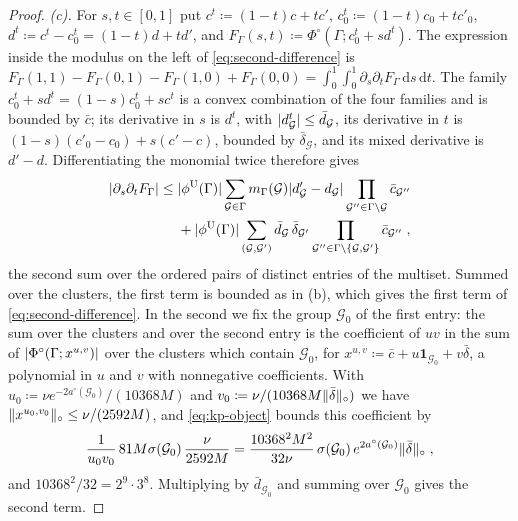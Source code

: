 \documentclass[11pt]{preprint}
\newcommand{\dd}{\mathrm{d}}
\DeclarePairedDelimiter{\abs}{\lvert}{\rvert}
\DeclarePairedDelimiter{\norm}{\lVert}{\rVert}
\numberwithin{equation}{section}
\theoremstyle{definition}
\theoremstyle{remark}
\theoremstyle{plain}
\begin{document}
\begin{proof}
\emph{(c).} For $s, t \in [0, 1]$ put $c^t \coloneqq (1 - t)c + tc'$, $c^t_0 \coloneqq (1 - t)c_0 + tc'_0$, $d^t \coloneqq c^t - c^t_0 = (1 - t)d + td'$, and $F_\Gamma(s, t) \coloneqq \Phi^\circ(\Gamma; c^t_0 + sd^t)$. The expression inside the modulus on the left of \eqref{eq:second-difference} is $F_\Gamma(1, 1) - F_\Gamma(0, 1) - F_\Gamma(1, 0) + F_\Gamma(0, 0) = \int_0^1\int_0^1\partial_s\partial_tF_\Gamma\,\dd s\,\dd t$. The family $c^t_0 + sd^t = (1 - s)c^t_0 + sc^t$ is a convex combination of the four families and is bounded by $\bar c$; its derivative in $s$ is $d^t$, with $\abs{d^t_{\mathcal G}} \leq \bar d_{\mathcal G}$, its derivative in $t$ is $(1 - s)(c'_0 - c_0) + s(c' - c)$, bounded by $\bar\delta_{\mathcal G}$, and its mixed derivative is $d' - d$. Differentiating the monomial twice therefore gives
\begin{align*}
    \abs{\partial_s\partial_tF_\Gamma} \leq{}& \abs{\phi^{\mathrm U}(\Gamma)}\sum_{\mathcal G \in \Gamma}m_\Gamma(\mathcal G)\abs{d'_{\mathcal G} - d_{\mathcal G}}\prod_{\mathcal G'' \in \Gamma \setminus \mathcal G}\bar c_{\mathcal G''}\\
    &+ \abs{\phi^{\mathrm U}(\Gamma)}\sum_{(\mathcal G, \mathcal G')}\bar d_{\mathcal G}\,\bar\delta_{\mathcal G'}\prod_{\mathcal G'' \in \Gamma \setminus \{\mathcal G, \mathcal G'\}}\bar c_{\mathcal G''}\;,
\end{align*}
the second sum over the ordered pairs of distinct entries of the multiset. Summed over the clusters, the first term is bounded as in (b), which gives the first term of \eqref{eq:second-difference}. In the second we fix the group $\mathcal G_0$ of the first entry: the sum over the clusters and over the second entry is the coefficient of $uv$ in the sum of $\abs{\Phi^\circ(\Gamma; x^{u,v})}$ over the clusters which contain $\mathcal G_0$, for $x^{u,v} \coloneqq \bar c + u\mathbf 1_{\mathcal G_0} + v\bar\delta$, a polynomial in $u$ and $v$ with nonnegative coefficients. With $u_0 \coloneqq \nu e^{-2a^\circ(\mathcal G_0)}/(10368M)$ and $v_0 \coloneqq \nu/(10368M\norm{\bar\delta}_\circ)$ we have $\norm{x^{u_0,v_0}}_\circ \leq \nu/(2592M)$, and \eqref{eq:kp-object} bounds this coefficient by
\[
    \frac{1}{u_0v_0}\,81M\sigma(\mathcal G_0)\,\frac{\nu}{2592M} = \frac{10368^2M^2}{32\nu}\,\sigma(\mathcal G_0)\,e^{2a^\circ(\mathcal G_0)}\norm{\bar\delta}_\circ\;,
\]
and $10368^2/32 = 2^{9}\cdot 3^{8}$. Multiplying by $\bar d_{\mathcal G_0}$ and summing over $\mathcal G_0$ gives the second term.
\end{proof}
\end{document}
